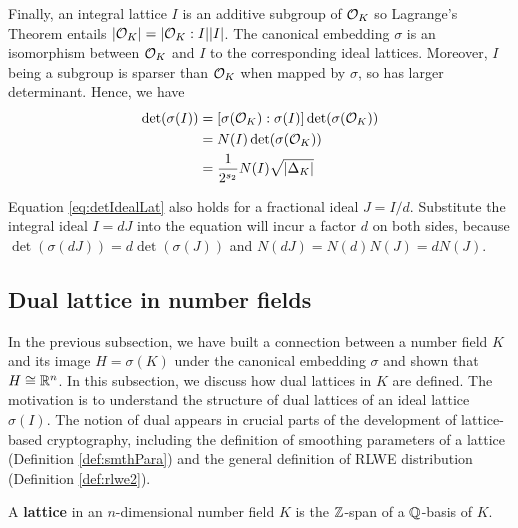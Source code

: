 \documentclass[../main.tex]{subfiles}
\begin{document}
Finally, an integral lattice $I$ is an additive subgroup of $\mathcal{O}_K$ so Lagrange's Theorem entails $|\mathcal{O}_K|=|\mathcal{O}_K:I||I|$. The canonical embedding $\sigma$ is an isomorphism between $\mathcal{O}_K$ and $I$ to the corresponding ideal lattices. Moreover, $I$ being a subgroup is sparser than $\mathcal{O}_K$ when mapped by $\sigma$, so has larger determinant. Hence, we have 
\reversemarginpar
{}
\begin{align}
\label{eq:detIdealLat}
    \det (\sigma(I)) &= [\sigma(\mathcal{O}_K):\sigma(I)] \det (\sigma(\mathcal{O}_K)) \nonumber \\ 
    &= N(I) \det (\sigma(\mathcal{O}_K)) \nonumber \\
    &= \frac{1}{2^{s_2}} N(I) \sqrt{|\Delta_K|}  
\end{align}

Equation \ref{eq:detIdealLat} also holds for a fractional ideal $J=I/d$. Substitute the integral ideal $I=dJ$ into the equation will incur a factor $d$ on both sides, because $\det(\sigma(dJ))=d\det(\sigma(J))$ and $N(dJ)=N(d)N(J)=dN(J)$.



\subsection{Dual lattice in number fields}
\label{subsec:dualLatInNumField}


In the previous subsection, we have built a connection between a number field $K$ and its image $H=\sigma(K)$ under the canonical embedding $\sigma$ and shown that $H \cong \mathbb{R}^n$. 
In this subsection, we discuss how dual lattices in $K$ are defined. The motivation is to understand the structure of dual lattices of an ideal lattice $\sigma(I)$. The notion of dual appears in crucial parts of the development of lattice-based cryptography, including the definition of smoothing parameters of a lattice (Definition \ref{def:smthPara}) and the general definition of RLWE distribution (Definition \ref{def:rlwe2}). 

\begin{definition}
\reversemarginpar
{}
A \textbf{lattice} in an $n$-dimensional number field $K$ is the $\mathbb{Z}$-span of a $\mathbb{Q}$-basis of $K$.  
\end{definition}
\end{document}
